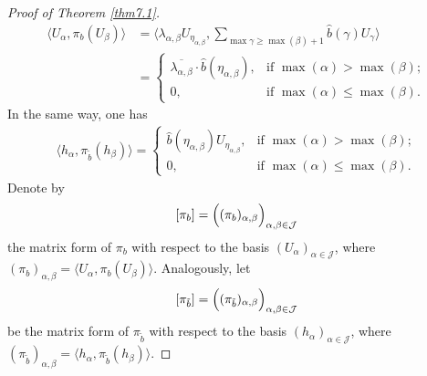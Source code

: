 \documentclass[oneside,english,a4wide]{amsart}
\numberwithin{equation}{section}
\numberwithin{figure}{section}
\theoremstyle{plain}
\theoremstyle{plain}
\theoremstyle{definition}
\theoremstyle{plain}
\theoremstyle{remark}
\theoremstyle{definition}
\theoremstyle{remark}
\theoremstyle{definition}
\newcommand{\8}{\infty}
\begin{document}
\begin{proof}[Proof of Theorem \ref{thm7.1}]
	\begin{equation*}
		\begin{aligned}
			\langle U_\alpha,\pi_b (U_\beta)\rangle{}&=\langle  \lambda_{\alpha,\beta}U_{\eta_{\alpha,\beta}},\sum_{\max \gamma\ge \max(\beta)+1}\hat{b}(\gamma)U_\gamma\rangle
		\\&=
		\begin{cases}
			\overline{\lambda_{\alpha,\beta}}\cdot \hat{b}(\eta_{\alpha,\beta}),& \text{if $\max(\alpha)>\max (\beta)$};\\
			0,& \text{if $\max(\alpha)\le\max (\beta)$}.
		\end{cases}
	\end{aligned}
\end{equation*}
In the same way, one has
\begin{equation*}
	\begin{aligned}
		\langle h_\alpha,\pi_{\tilde{b}} (h_\beta)\rangle=
		\begin{cases}
			\hat{b}(\eta_{\alpha,\beta})U_{\eta_{\alpha,\beta}},& \text{if $\max (\alpha)>\max (\beta)$};\\
			0,& \text{if $\max (\alpha)\le\max (\beta)$}.
		\end{cases}
	\end{aligned}
\end{equation*}
Denote by \[[\pi_b]=\Bigl((\pi_b)_{\alpha,\beta}\Bigr)_{\alpha,\beta\in\mathcal{J}}\] 
the matrix form of $\pi_b$ with respect to the basis $(U_\alpha)_{\alpha\in\mathcal{J}}$, where
$(\pi_b)_{\alpha,\beta}=\langle U_\alpha,\pi_b (U_\beta)\rangle$. Analogously, let
\[[\pi_{\tilde{b}}]=\Bigl((\pi_{\tilde{b}})_{\alpha,\beta}\Bigr)_{\alpha,\beta\in\mathcal{J}}\]
be the matrix form of $\pi_{\tilde{b}}$ with respect to the basis $(h_\alpha)_{\alpha\in\mathcal{J}}$, where
$(\pi_{\tilde{b}})_{\alpha,\beta}=\langle h_\alpha,\pi_{\tilde{b}} (h_\beta)\rangle$.


\end{proof}
\end{document}
